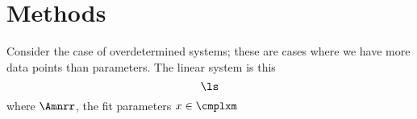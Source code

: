 \section{Methods}

Consider the case of overdetermined systems; these are cases where we have more data points than parameters. The linear system is this
\begin{equation*}
  \ls
\end{equation*}
where $\Amnrr$, the fit parameters $x\in\cmplxm$



\endinput